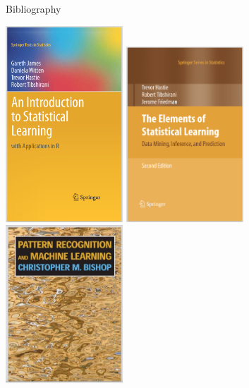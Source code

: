\documentclass[pdf]{beamer}
\newif\ifplacelogo %
\begin{document}
\begin{frame}{Bibliography}
\begin{center}
	\includegraphics[width=0.33\textwidth, height=0.65\textheight]{bookJames.png}
	\includegraphics[width=0.33\textwidth, height=0.65\textheight]{bookHastie.png}
	\includegraphics[width=0.33\textwidth, height=0.65\textheight]{bookBishop.png}
\end{center}
\end{frame}
\placelogofalse %
\end{document}
